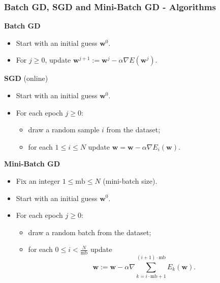\documentclass{beamer}
\begin{document}
	\begin{frame}
		\frametitle{Batch GD, SGD and Mini-Batch GD - Algorithms}
		
		
		\textbf{Batch GD}
		\begin{itemize}
			\item Start with an initial guess $\bm{w}^0$.
			\item For $j \geq 0$, update $\bm{w}^{j+1} := \bm{w}^{j} - \alpha \nabla E(\bm{w}^j)$.
		\end{itemize}
		
		\textbf{SGD} (online)
		\begin{itemize}
			\item Start with an initial guess $\bm{w}^0$.
			\item For each epoch $j \geq 0$:
			\begin{itemize}
				\item draw a random sample $i$ from the dataset;
				\item for each $1\leq i \leq N$ update $\bm{w} = \bm{w} - \alpha \nabla E_i(\bm{w})$.
			\end{itemize}
		\end{itemize}
	
		\textbf{Mini-Batch GD}
		\begin{itemize}
			\item Fix an integer $1 \leq \text{mb} \leq N$ (mini-batch size).
			\item Start with an initial guess $\bm{w}^0$.
			\item For each epoch $j \geq 0$:
			\begin{itemize}
				\item draw a random batch from the dataset;
				\item for each $0 \leq i < \frac{N}{\text{mb}}$ update
				\begin{equation*}
					\bm{w} := \bm{w} - \alpha \nabla \sum_{k=i\cdot\text{mb} + 1}^{(i+1)\cdot\text{mb}}E_k(\bm{w}).
				\end{equation*}
			\end{itemize} 
		\end{itemize}
		
	\end{frame}
\end{document}
